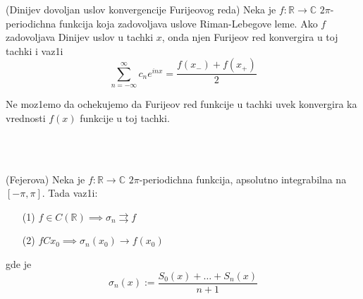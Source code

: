 \documentclass[a4paper,12pt]{article}
\newcommand{\RR}{\mathbb{R}}
\newcommand{\CC}{\mathbb{C}}
\begin{document}
\begin{tma}(Dinijev dovoljan uslov konvergencije Furijeovog reda)
Neka je $f: \RR \to \CC$ $2 \pi$-periodichna funkcija koja zadovoljava uslove Riman-Lebegove leme. Ako $f$ zadovoljava Dinijev uslov u tachki $x$, onda njen Furijeov red konvergira u toj tachki i vaz1i
\[\sum_{n = - \infty}^{\infty} c_n e^{inx} = \frac{f(x_-) + f(x_+)}{2}\]
\end{tma}
\begin{nap}
Ne moz1emo da ochekujemo da Furijeov red funkcije u tachki uvek konvergira ka vrednosti $f(x)$ funkcije u toj tachki.
\end{nap}
\\ \\
\begin{tma}
(Fejerova) Neka je $f: \RR \to \CC$ $2 \pi$-periodichna funkcija, apsolutno integrabilna na $[-\pi, \pi]$. Tada vaz1i:
\begin{itemize}
\item[(1)] $f \in C(\RR) \implies \sigma_n \rightrightarrows f$
\item[(2)] $fCx_0 \implies \sigma_n(x_0) \to f(x_0)$
\end{itemize}
gde je \[\sigma_n(x):= \frac{S_0(x) + \dots + S_n(x)}{n+1}\]
\end{tma}
\end{document}
